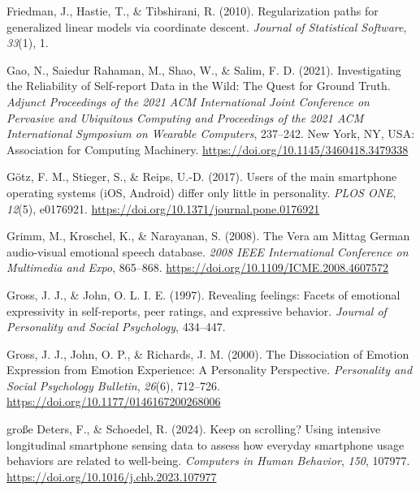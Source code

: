 \documentclass[
  english,
  man,floatsintext]{apa6}
\newlength{\cslhangindent}
\newenvironment{CSLReferences}[2] %
 {%
  \setlength{\parindent}{0pt}
  \ifodd #1 \everypar{\setlength{\hangindent}{\cslhangindent}}\ignorespaces\fi
  \ifnum #2 > 0
  \setlength{\parskip}{#2\baselineskip}
  \fi
 }%
 {}
\begin{document}
\begin{CSLReferences}{1}{0}
\leavevmode{}%
Friedman, J., Hastie, T., \& Tibshirani, R. (2010). Regularization paths for generalized linear models via coordinate descent. \emph{Journal of Statistical Software}, \emph{33}(1), 1.

\leavevmode{}%
Gao, N., Saiedur Rahaman, M., Shao, W., \& Salim, F. D. (2021). Investigating the {Reliability} of {Self-report Data} in the {Wild}: {The Quest} for {Ground Truth}. \emph{Adjunct {Proceedings} of the 2021 {ACM International Joint Conference} on {Pervasive} and {Ubiquitous Computing} and {Proceedings} of the 2021 {ACM International Symposium} on {Wearable Computers}}, 237--242. New York, NY, USA: Association for Computing Machinery. \url{https://doi.org/10.1145/3460418.3479338}

\leavevmode{}%
Götz, F. M., Stieger, S., \& Reips, U.-D. (2017). Users of the main smartphone operating systems ({iOS}, {Android}) differ only little in personality. \emph{PLOS ONE}, \emph{12}(5), e0176921. \url{https://doi.org/10.1371/journal.pone.0176921}

\leavevmode{}%
Grimm, M., Kroschel, K., \& Narayanan, S. (2008). The {Vera} am {Mittag German} audio-visual emotional speech database. \emph{2008 {IEEE International Conference} on {Multimedia} and {Expo}}, 865--868. \url{https://doi.org/10.1109/ICME.2008.4607572}

\leavevmode{}%
Gross, J. J., \& John, O. L. I. E. (1997). Revealing feelings: {Facets} of emotional expressivity in self-reports, peer ratings, and expressive behavior. \emph{Journal of Personality and Social Psychology}, 434--447.

\leavevmode{}%
Gross, J. J., John, O. P., \& Richards, J. M. (2000). The {Dissociation} of {Emotion Expression} from {Emotion Experience}: {A Personality Perspective}. \emph{Personality and Social Psychology Bulletin}, \emph{26}(6), 712--726. \url{https://doi.org/10.1177/0146167200268006}

\leavevmode{}%
große Deters, F., \& Schoedel, R. (2024). Keep on scrolling? {Using} intensive longitudinal smartphone sensing data to assess how everyday smartphone usage behaviors are related to well-being. \emph{Computers in Human Behavior}, \emph{150}, 107977. \url{https://doi.org/10.1016/j.chb.2023.107977}


\end{CSLReferences}
\end{document}
